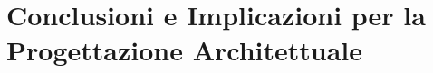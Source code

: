 






\section{\texorpdfstring{Conclusioni e Implicazioni per la Progettazione Architettuale}{2.7 - Conclusioni e Implicazioni per la Progettazione Architettuale}}

